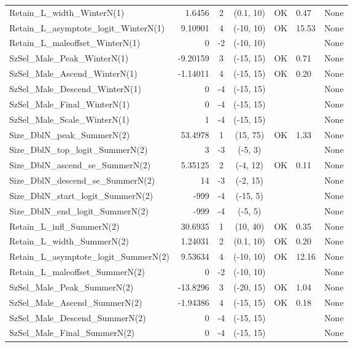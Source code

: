\documentclass[12pt,]{article}
\begin{document}
\begin{landscape}
\begin{longtable}{lrcccll}
  Retain\_L\_width\_WinterN(1) & 1.6456 & 2 & (0.1, 10) & OK & 0.47 & None \\ 
  Retain\_L\_asymptote\_logit\_WinterN(1) & 9.10901 & 4 & (-10, 10) & OK & 15.53 & None \\ 
  Retain\_L\_maleoffset\_WinterN(1) & 0 & -2 & (-10, 10) &  &  & None \\ 
  SzSel\_Male\_Peak\_WinterN(1) & -9.20159 & 3 & (-15, 15) & OK & 0.71 & None \\ 
  SzSel\_Male\_Ascend\_WinterN(1) & -1.14011 & 4 & (-15, 15) & OK & 0.20 & None \\ 
  SzSel\_Male\_Descend\_WinterN(1) & 0 & -4 & (-15, 15) &  &  & None \\ 
  SzSel\_Male\_Final\_WinterN(1) & 0 & -4 & (-15, 15) &  &  & None \\ 
  SzSel\_Male\_Scale\_WinterN(1) & 1 & -4 & (-15, 15) &  &  & None \\ 
  Size\_DblN\_peak\_SummerN(2) & 53.4978 & 1 & (15, 75) & OK & 1.33 & None \\ 
  Size\_DblN\_top\_logit\_SummerN(2) & 3 & -3 & (-5, 3) &  &  & None \\ 
  Size\_DblN\_ascend\_se\_SummerN(2) & 5.35125 & 2 & (-4, 12) & OK & 0.11 & None \\ 
  Size\_DblN\_descend\_se\_SummerN(2) & 14 & -3 & (-2, 15) &  &  & None \\ 
  Size\_DblN\_start\_logit\_SummerN(2) & -999 & -4 & (-15, 5) &  &  & None \\ 
  Size\_DblN\_end\_logit\_SummerN(2) & -999 & -4 & (-5, 5) &  &  & None \\ 
  Retain\_L\_infl\_SummerN(2) & 30.6935 & 1 & (10, 40) & OK & 0.35 & None \\ 
  Retain\_L\_width\_SummerN(2) & 1.24031 & 2 & (0.1, 10) & OK & 0.20 & None \\ 
  Retain\_L\_asymptote\_logit\_SummerN(2) & 9.53634 & 4 & (-10, 10) & OK & 12.16 & None \\ 
  Retain\_L\_maleoffset\_SummerN(2) & 0 & -2 & (-10, 10) &  &  & None \\ 
  SzSel\_Male\_Peak\_SummerN(2) & -13.8296 & 3 & (-20, 15) & OK & 1.04 & None \\ 
  SzSel\_Male\_Ascend\_SummerN(2) & -1.94386 & 4 & (-15, 15) & OK & 0.18 & None \\ 
  SzSel\_Male\_Descend\_SummerN(2) & 0 & -4 & (-15, 15) &  &  & None \\ 
  SzSel\_Male\_Final\_SummerN(2) & 0 & -4 & (-15, 15) &  &  & None \\ 

\end{longtable}
\end{landscape}
\end{document}

